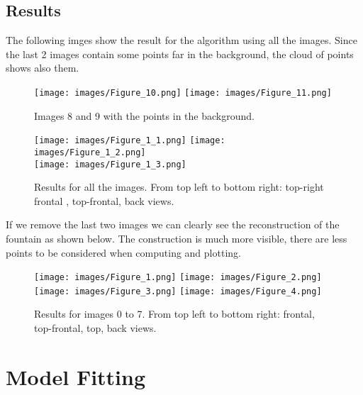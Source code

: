 \documentclass{ETHExercise}
\begin{document}
\subsection{Results}
The following imges show the result for the algorithm using all the images.
Since the last 2 images contain some points far in the background, the cloud of 
points shows also them.

\begin{figure}[!h]
    \texttt{[image: images/Figure\_10.png]}
  \endminipage
    \texttt{[image: images/Figure\_11.png]}
  \endminipage
  \caption{Images 8 and 9 with the points in the background.}
\end{figure}


\begin{figure}[!h]
    \texttt{[image: images/Figure\_1\_1.png]}
  \endminipage
    \texttt{[image: images/Figure\_1\_2.png]}
  \endminipage\\
    \texttt{[image: images/Figure\_1\_3.png]}
  \endminipage
  \caption{Results for all the images. From top left to bottom right:
  top-right frontal , top-frontal, back views.}
\end{figure}

\newpage
If we remove the last two images we can clearly see the reconstruction 
of the fountain as shown below. The construction is much more visible,
there are less points to be considered when computing and plotting.


\begin{figure}[!h]
    \texttt{[image: images/Figure\_1.png]}
  \endminipage
    \texttt{[image: images/Figure\_2.png]}
  \endminipage\\
    \texttt{[image: images/Figure\_3.png]}
  \endminipage
    \texttt{[image: images/Figure\_4.png]}
  \endminipage
  \caption{Results for images 0 to 7. From top left to bottom right:
  frontal, top-frontal, top, back views.}
\end{figure}
 
\newpage
\section{Model Fitting}
\end{document}
